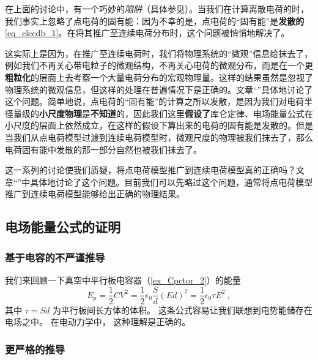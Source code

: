 在上面的讨论中，有一个巧妙的\textsl{陷阱}（具体参见\cite{GriffE}）。当我们在计算离散电荷的时，我们事实上忽略了点电荷的固有能：因为不幸的是，点电荷的“固有能”是\textbf{发散的}\autoref{eq_elecdb_1}。在将其推广至连续电荷分布时，这个问题被悄悄地解决了。

这实际上是因为，在推广至连续电荷时，我们将物理系统的“微观”信息给抹去了，例如我们不再关心带电粒子的微观结构，不再关心电荷的微观分布，而是在一个更\textbf{粗粒化}的层面上去考察一个大量电荷分布的宏观物理量。这样的结果虽然是忽视了物理系统的微观信息，但这样的处理在普遍情况下是正确的。文章“”具体地讨论了这个问题。简单地说，点电荷的“固有能”的计算之所以发散，是因为我们对电荷半径量级的\textbf{小尺度物理}是\textbf{不知道}的，因此我们这里\textbf{假设了}库仑定律、电场能量公式在小尺度的层面上依然成立，在这样的假设下算出来的电荷的固有能是发散的。但是当我们从点电荷模型过渡到连续电荷模型时，微观尺度的物理被我们抹去了，那么电荷固有能中发散的那一部分自然也被我们抹去了。

这一系列的讨论使我们质疑，将点电荷模型推广到连续电荷模型真的正确吗？文章“”中具体地讨论了这个问题。目前我们可以先略过这个问题，通常将点电荷模型推广到连续电荷模型能够给出正确的物理结果。

\subsection{电场能量公式的证明}

\subsubsection{基于电容的不严谨推导}
我们来回顾一下真空中平行板电容器（\autoref{ex_Cpctor_2}）的能量
\begin{equation}
E_p = \frac12 CV^2 = \frac12 \epsilon_0 \frac Sd (Ed)^2 = \frac 12 \epsilon_0 \tau E^2~,
\end{equation}
其中 $\tau = Sd$ 为平行板间长方体的体积。 这条公式容易让我们联想到电势能储存在电场之中。 在电动力学中， 这种理解是正确的。

\subsubsection{更严格的推导}


